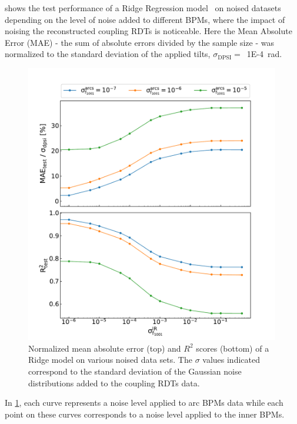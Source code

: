  shows the test performance of a Ridge Regression model~\cite{MIT:Rifkin:Regularized_Least_Squares} on noised datasets depending on the level of noise added to different BPMs, where the impact of noising the reconstructed coupling RDTs is noticeable.
Here the Mean Absolute Error (MAE) - the sum of absolute errors divided by the sample size - was normalized to the standard deviation of the applied tilts, \(\sigma_{\mathrm{DPSI}} =\)~\qty{1E-4}{\radian}.

\begin{figure}[!htb]
    \centering
    \includegraphics*[width=0.99\textwidth]{Figures/ML_for_IR_Coupling/ml_ridge_performance.pdf}
    \caption{Normalized mean absolute error (top) and \(R^2\) scores (bottom) of a Ridge model on various noised data sets. The \(\sigma\) values indicated correspond to the standard deviation of the Gaussian noise distributions added to the coupling RDTs data.}
    \label{figure:ridge_performance}
\end{figure}

In \cref{figure:ridge_performance}, each curve represents a noise level applied to arc BPMs data while each point on these curves corresponds to a noise level applied to the inner BPMs.

